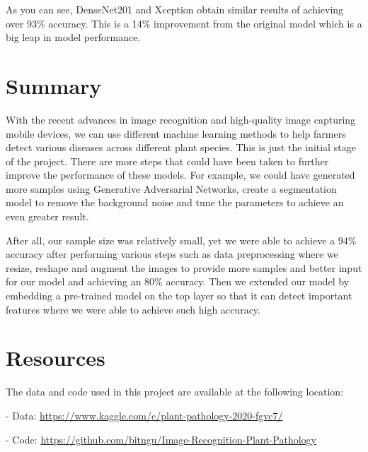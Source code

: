 \documentclass[man,floatsintext]{apa7}
\begin{document}
\begin{singlespace}
As you can see, DenseNet201 and Xception obtain similar results of achieving over 93$\%$ accuracy. This is a 14$\%$ improvement from the original model which is a big leap in model
performance.


\section{Summary}
With the recent advances in image recognition and high-quality image capturing mobile devices, we can use different machine learning methods to help farmers detect various diseases
across different plant species. This is just the initial stage of the project. There are more steps that could have been taken to further improve the performance of these models. For example,
we could have generated more samples using Generative Adversarial Networks, create a segmentation model to remove the background noise and tune the parameters to achieve an even greater result.

After all, our sample size was relatively small, yet we were able to achieve a 94$\%$ accuracy after performing various steps such as data preprocessing where we resize, reshape and augment the images to provide more samples and better input for our model and achieving an 80$\%$ accuracy. Then we extended our model by embedding a pre-trained model on the top layer so that it can detect important features where we were able to achieve such high accuracy.


\section{Resources}
The data and code used in this project are available at the following location:

- Data: \url{https://www.kaggle.com/c/plant-pathology-2020-fgvc7/}

- Code: \url{https://github.com/bitngu/Image-Recognition-Plant-Pathology}

\printbibliography

\end{singlespace}
\end{document}
